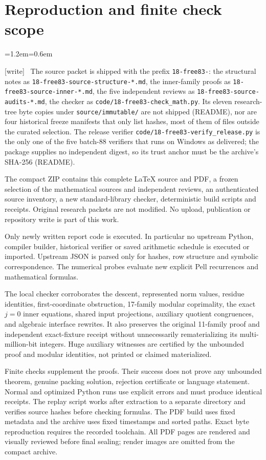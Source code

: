 \documentclass[11pt,letterpaper]{article}
\theoremstyle{definition}\newtheorem{definition}[theorem]{Definition}
\theoremstyle{remark}\newtheorem{remark}[theorem]{Remark}
\newcommand{\wtag}{\textup{[write]}}
\newenvironment{writenote}{\par\smallskip\begin{list}{}{\leftmargin=1.2em\rightmargin=0.6em}\item[]\small\wtag\ }{\end{list}\smallskip}
\newcommand{\rw}[1]{\nolinkurl{#1}}%
\begin{document}
\section{Reproduction and finite check scope}
\label{fup:fc:app:replay}
\begin{writenote}
The source packet is shipped with the prefix \texttt{18-free83-}: the structural notes as \rw{18-free83-source-structure-*.md}, the inner-family proofs as \rw{18-free83-source-inner-*.md}, the five independent reviews as \rw{18-free83-source-audits-*.md}, the checker as \rw{code/18-free83-check_math.py}. Its eleven research-tree byte copies under \rw{source/immutable/} are not shipped (README), nor are four historical freeze manifests that only list hashes, most of them of files outside the curated selection. The release verifier \rw{code/18-free83-verify_release.py} is the only one of the five batch-88 verifiers that runs on Windows as delivered; the package supplies no independent digest, so its trust anchor must be the archive's SHA-256 (README).
\end{writenote}
The compact ZIP contains this complete LaTeX source and PDF, a frozen
selection of the mathematical sources and independent reviews, an
authenticated source inventory, a new standard-library checker, deterministic
build scripts and receipts. Original research packets are not modified.
No upload, publication or repository write is part of this work.

Only newly written report code is executed. In particular no upstream
Python, compiler builder, historical verifier or saved arithmetic schedule
is executed or imported. Upstream JSON is parsed only for hashes, row
structure and symbolic correspondence. The numerical probes evaluate
new explicit Pell recurrences and mathematical formulas.

The local checker corroborates the descent, represented norm values,
residue identities, first-coordinate obstruction, 17-family modular
coprimality, the exact $j=0$ inner equations, shared input projections,
auxiliary quotient congruences, and algebraic interface rewrites. It also
preserves the original 11-family proof and independent exact-fixture
receipt without unnecessarily rematerializing its multi-million-bit
integers. Huge auxiliary witnesses are certified by the unbounded proof
and modular identities, not printed or claimed materialized.

Finite checks supplement the proofs. Their success does not prove any
unbounded theorem, genuine packing solution, rejection certificate or
language statement. Normal and optimized Python runs use explicit errors
and must produce identical receipts. The replay script works after
extraction to a separate directory and verifies source hashes before
checking formulas. The PDF build uses fixed metadata and the archive
uses fixed timestamps and sorted paths. Exact byte reproduction requires
the recorded toolchain. All PDF pages are rendered and visually reviewed
before final sealing; render images are omitted from the compact archive.
\end{document}
